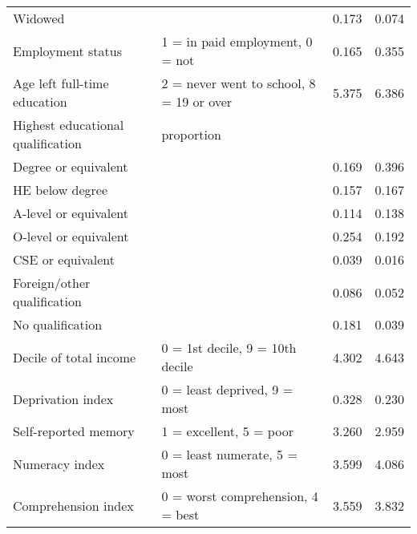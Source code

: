 \documentclass[12pt]{article}
\begin{document}
\begin{sidewaystable}[h!]
\begin{tabular}{llcc}
            \hspace{0.5cm} Widowed &  & 0.173 & 0.074 \\
            Employment status & 1 = in paid employment, 0 = not & 0.165 & 0.355 \\
            Age left full-time education & 2 = never went to school, 8 = 19 or over & 5.375 & 6.386 \\
            Highest educational qualification & proportion & & \\
            \hspace{0.5cm} Degree or equivalent &  & 0.169 & 0.396 \\
            \hspace{0.5cm} HE below degree &  & 0.157 & 0.167 \\
            \hspace{0.5cm} A-level or equivalent &  & 0.114 & 0.138 \\
            \hspace{0.5cm} O-level or equivalent &  & 0.254 & 0.192 \\
            \hspace{0.5cm} CSE or equivalent &  & 0.039 & 0.016 \\
            \hspace{0.5cm} Foreign/other qualification &  & 0.086 & 0.052 \\
            \hspace{0.5cm} No qualification &  & 0.181 & 0.039 \\
            Decile of total income & 0 = 1st decile, 9 = 10th decile & 4.302 & 4.643 \\
            Deprivation index & 0 = least deprived, 9 = most & 0.328 & 0.230 \\
            Self-reported memory & 1 = excellent, 5 = poor & 3.260 & 2.959 \\
            Numeracy index & 0 = least numerate, 5 = most & 3.599 & 4.086 \\
            Comprehension index & 0 = worst comprehension, 4 = best & 3.559 & 3.832 \\
            \bottomrule
        \end{tabular}
    \end{sidewaystable}
\end{document}

